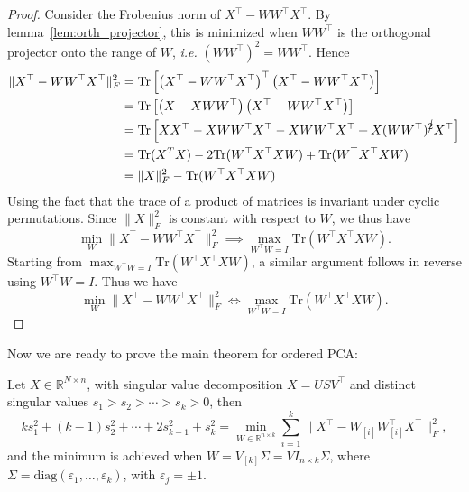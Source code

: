 \documentclass[twoside,11pt]{article}
\begin{document}
\begin{proof}
    Consider the Frobenius norm of $X^\top - WW^\top X^\top$. By lemma~\ref{lem:orth_projector}, this is minimized when $WW^\top$ is the orthogonal projector onto the range of $W$, \emph{i.e.} $(WW^\top)^2 = WW^\top$. Hence
    \begin{align*}
        \|X^\top - WW^\top X^\top\|_F^2 &= \text{Tr}\left[\left(X^\top-WW^\top X^\top\right)^\top\left(X^\top-WW^\top X^\top\right)\right]\\&=
        \text{Tr}\left[\left(X-XWW^\top\right)\left(X^\top-WW^\top X^\top\right)\right]
        \\&=
        \text{Tr}\left[XX^\top - XWW^\top X^\top - XWW^\top X^\top + X(WW^\top)^{\cancel{2}} X^\top\right]
        \\&= \text{Tr}(X^TX) - 2\text{Tr}(W^\top X^\top XW) + \text{Tr}(W^\top X^\top XW)\\&=
        \|X\|_F^2 - \text{Tr}(W^\top X^\top XW)
    \end{align*}
    Using the fact that the trace of a product of matrices is invariant under cyclic permutations. Since $\|X\|_F^2$ is constant with respect to $W$, we thus have \[\min_{W} \| X^\top - W W^\top X^\top \|_F^2 \implies \max_{W^\top W = I}  \text{Tr}(W^\top X^\top X W).\] Starting from $\max_{W^\top W = I}  \text{Tr}(W^\top X^\top X W)$, a similar argument follows in reverse using $W^\top W = I$. Thus we have 
    \[\min_{W} \| X^\top - W W^\top X^\top \|_F^2 \iff \max_{W^\top W = I}  \text{Tr}(W^\top X^\top X W).\]
\end{proof}

Now we are ready to prove the main theorem for ordered PCA:
    
\begin{theorem}
\label{thm:dend_loss}
    Let $X \in \mathbb{R}^{N \times n}$, with singular value decomposition $X=USV^\top$ and distinct singular values $s_1>s_2>\cdots>s_k>0$, then 
\[ k s_1^2 + (k-1)s_2^2 + \cdots + 2 s_{k-1}^2 + s_k^2 = \min_{W \in \mathbb{R}^{n \times k}}\sum_{i=1}^k  \|X^\top-W_{[i]}W_{[i]}^\top X^\top\|_F^2, \]
and the minimum is achieved when $W=V_{[k]}\Sigma=VI_{n\times k}\Sigma$, where $\Sigma = \mathrm{diag}(\varepsilon_1, \dots, \varepsilon_k)$, with $\varepsilon_j = \pm 1$.
\end{theorem}
\end{document}
